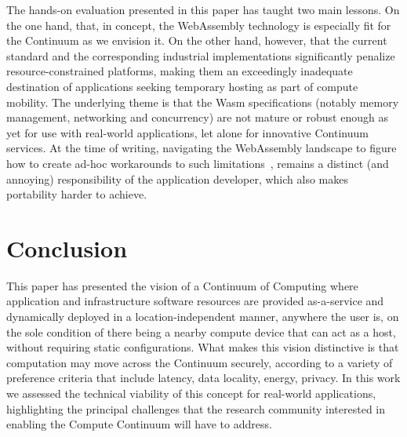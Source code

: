 The hands-on evaluation presented in this paper has taught two main lessons.
On the one hand, that, in concept, the WebAssembly technology is especially fit for the Continuum as we envision it.
On the other hand, however, that the current standard and the corresponding industrial implementations significantly penalize resource-constrained platforms, making them an exceedingly inadequate destination of applications seeking temporary hosting as part of compute mobility.
The underlying theme is that the Wasm specifications (notably memory management, networking and concurrency) are not mature or robust enough as yet for use with real-world applications, let alone for innovative Continuum services. 
At the time of writing, navigating the WebAssembly landscape to figure how to create ad-hoc workarounds to such limitations~\cite{wasm-experimental-http}, 
remains a distinct (and annoying) responsibility of the application developer, which also makes portability harder to achieve.

\section{Conclusion}
\label{sec:conclusion}

This paper has presented the vision of a Continuum of Computing where application and infrastructure software resources are provided as-a-service and dynamically deployed in a location-independent manner, anywhere the user is, on the sole condition of there being a nearby compute device that can act as a host, without requiring static configurations. 
What makes this vision distinctive is that computation may move across the Continuum securely, according to a variety of preference criteria that include latency, data locality, energy, privacy.
In this work we assessed the technical viability of this concept for real-world applications, highlighting the principal challenges that the research community interested in enabling the Compute Continuum will have to address. 


